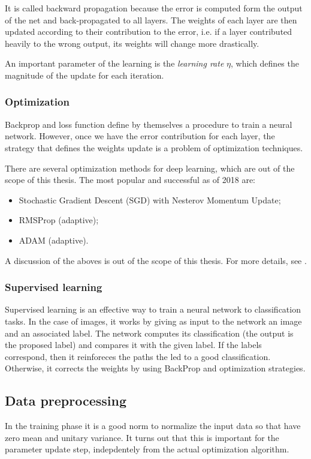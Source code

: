 It is called backward propagation because the error is computed form the output of the net and back-propagated to all layers. The weights of each layer are then updated according to their contribution to the error, i.e. if a layer contributed heavily to the wrong output, its weights will change more drastically.  

An important parameter of the learning is the \emph{learning rate} $\eta$, which defines the magnitude of the update for each iteration. 

\subsubsection{Optimization}
Backprop and loss function define by themselves a procedure to train a neural network. However, once we have the error contribution for each layer, the strategy that defines the weights update is a problem of optimization techniques. 

There are several optimization methods for deep learning, which are out of the scope of this thesis. The most popular and successful as of 2018 are: 
\begin{itemize}
    \item Stochastic Gradient Descent (SGD) with Nesterov Momentum Update;
    
    \item RMSProp (adaptive);
    
    \item ADAM (adaptive).
\end{itemize}

A discussion of the aboves is out of the scope of this thesis. For more details, see \parencite{sgd-overview}.

\subsubsection{Supervised learning}
Supervised learning is an effective way to train a neural network to classification tasks. In the case of images, it works by giving as input to the network an image and an associated label. The network computes its classification (the output is the proposed label) and compares it with the given label. If the labels correspond, then it reinforeces the paths the led to a good classification. Otherwise, it corrects the weights by using BackProp and optimization strategies. 

\subsection{Data preprocessing}
In the training phase it is a good norm to normalize the input data so that have zero mean and unitary variance. It turns out that this is important for the parameter update step, indepdentely from the actual optimization algorithm. 

